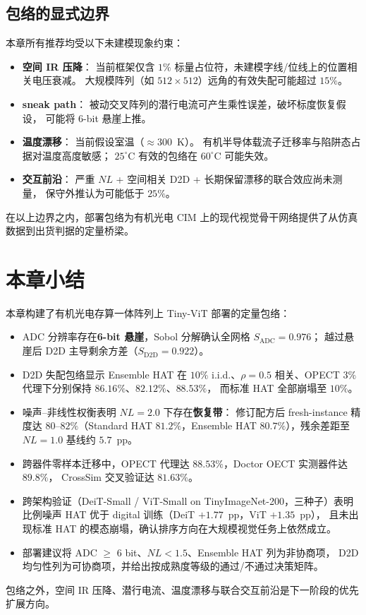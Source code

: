 \subsection{包络的显式边界}

本章所有推荐均受以下未建模现象约束：
\begin{itemize}
    \item \textbf{空间 IR 压降}：
    当前框架仅含 $1\%$ 标量占位符，未建模字线/位线上的位置相关电压衰减。
    大规模阵列（如 $512\times512$）远角的有效失配可能超过 $15\%$。
    \item \textbf{ sneak path}：
    被动交叉阵列的潜行电流可产生乘性误差，破坏标度恢复假设，
    可能将 6-bit 悬崖上推。
    \item \textbf{温度漂移}：
    当前假设室温（$\approx 300$~K）。
    有机半导体载流子迁移率与陷阱态占据对温度高度敏感；
    $25^{\circ}$C 有效的包络在 $60^{\circ}$C 可能失效。
    \item \textbf{交互前沿}：
    严重 $NL$ + 空间相关 D2D + 长期保留漂移的联合效应尚未测量，
    保守外推认为可能低于 $25\%$。
\end{itemize}

在以上边界之内，部署包络为有机光电 CIM 上的现代视觉骨干网络提供了从仿真数据到出货判据的定量桥梁。


\section*{本章小结}

本章构建了有机光电存算一体阵列上 Tiny-ViT 部署的定量包络：
\begin{itemize}
    \item ADC 分辨率存在\textbf{6-bit 悬崖}，Sobol 分解确认全网格 $S_{\mathrm{ADC}}=0.976$；
    越过悬崖后 D2D 主导剩余方差（$S_{\mathrm{D2D}}=0.922$）。
    \item D2D 失配包络显示 Ensemble HAT 在 $10\%$ i.i.d.、$\rho=0.5$ 相关、OPECT $3\%$ 代理下分别保持 $86.16\%$、$82.12\%$、$88.53\%$，
    而标准 HAT 全部崩塌至 $10\%$。
    \item 噪声--非线性权衡表明 $NL=2.0$ 下存在\textbf{恢复带}：
    修订配方后 fresh-instance 精度达 $80$--$82\%$（Standard HAT $81.2\%$，Ensemble HAT $80.7\%$），残余差距至 $NL=1.0$ 基线约 $5.7$~pp。
    \item 跨器件零样本迁移中，OPECT 代理达 $88.53\%$，Doctor OECT 实测器件达 $89.8\%$，
    CrossSim 交叉验证达 $81.63\%$。
    \item 跨架构验证（DeiT-Small / ViT-Small on TinyImageNet-200，三种子）表明比例噪声 HAT 优于 digital 训练（DeiT $+1.77$~pp，ViT $+1.35$~pp），
    且未出现标准 HAT 的模态崩塌，确认排序方向在大规模视觉任务上依然成立。
    \item 部署建议将 ADC $\ge$ 6 bit、$NL < 1.5$、Ensemble HAT 列为非协商项，
    D2D 均匀性列为可协商项，并给出按成熟度等级的通过/不通过决策矩阵。
\end{itemize}
包络之外，空间 IR 压降、潜行电流、温度漂移与联合交互前沿是下一阶段的优先扩展方向。
